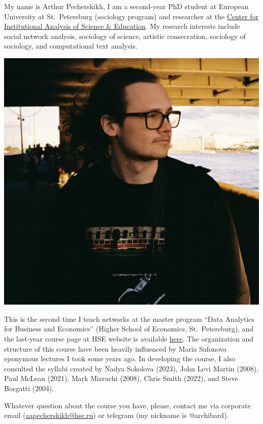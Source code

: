 \documentclass[
]{book}
\begin{document}
My name is Arthur Pecherskikh, I am a second-year PhD student at European University at St.~Petersburg (sociology program) and researcher at the \href{https://ciase.ru/}{Center for Institutional Analysis of Science \& Education}. My research interests include social network analysis, sociology of science, artistic consecration, sociology of sociology, and computational text analysis.

\begin{center}\includegraphics[width=1\linewidth]{images/arthur-pick} \end{center}

This is the second time I teach networks at the master program ``Data Analytics for Business and Economics'' (Higher School of Economics, St.~Petersburg), and the last-year course page at HSE website is available \href{https://spb.hse.ru/en/ma/data-analytics/courses/904345939.html}{here}. The organization and structure of this course have been heavily influenced by Maria Safonova eponymous lectures I took some years ago. In developing the course, I also consulted the syllabi created by Nadya Sokolova (2023), John Levi Martin (2008), Paul McLean (2021), Mark Mizruchi (2008), Chris Smith (2022), and Steve Borgatti (2004).

Whatever question about the course you have, please, contact me via corporate email (\url{aapecherskikh@hse.ru}) or telegram (my nickname is {@archibard}).
\end{document}
